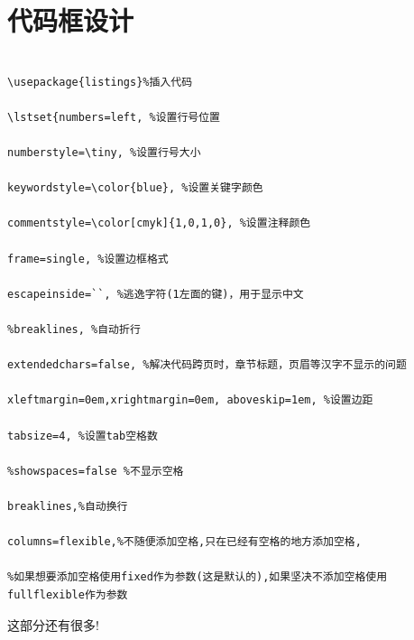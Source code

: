 \documentclass[cn,chinese,color=cyan]{elegantbook}
\begin{document}
\section{代码框设计}
\begin{lstlisting}[style=R]

\usepackage{listings}%插入代码

\lstset{numbers=left, %设置行号位置

numberstyle=\tiny, %设置行号大小

keywordstyle=\color{blue}, %设置关键字颜色

commentstyle=\color[cmyk]{1,0,1,0}, %设置注释颜色

frame=single, %设置边框格式

escapeinside=``, %逃逸字符(1左面的键)，用于显示中文

%breaklines, %自动折行

extendedchars=false, %解决代码跨页时，章节标题，页眉等汉字不显示的问题

xleftmargin=0em,xrightmargin=0em, aboveskip=1em, %设置边距

tabsize=4, %设置tab空格数

%showspaces=false %不显示空格

breaklines,%自动换行

columns=flexible,%不随便添加空格,只在已经有空格的地方添加空格,

%如果想要添加空格使用fixed作为参数(这是默认的),如果坚决不添加空格使用fullflexible作为参数

\end{lstlisting}
这部分还有很多!
\end{document}
